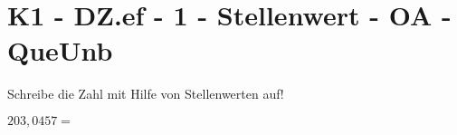 \section{K1 - DZ.ef - 1 - Stellenwert - OA - QueUnb}

\begin{beispiel}{0} %
				Schreibe die Zahl mit Hilfe von Stellenwerten auf!\leer
					
					$203,0457=$ 
\end{beispiel}